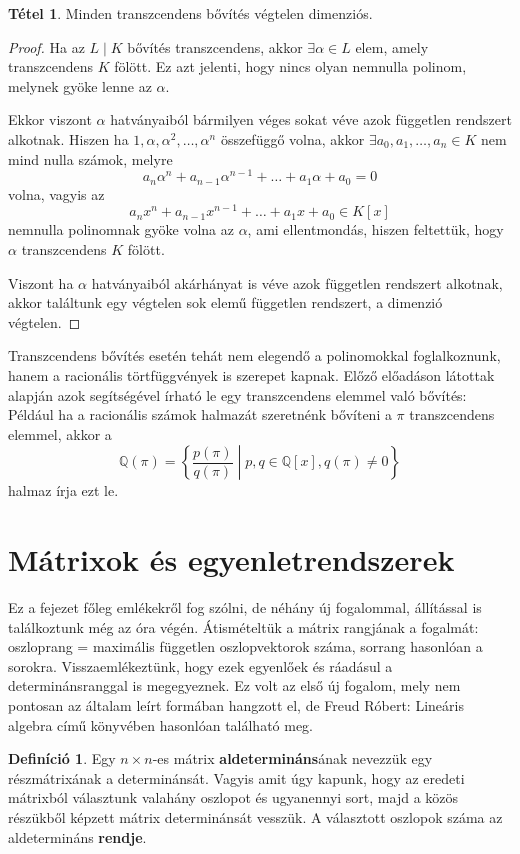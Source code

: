 \documentclass[12pt]{book}
\theoremstyle{plain} %
\theoremstyle{definition} %
\newtheorem{defi/}{Definíció}[section]
\newenvironment{defi}
  {\renewcommand{\qedsymbol}{$\clubsuit$}%
   \pushQED{\qed}\begin{defi/}}
  {\popQED\end{defi/}}
\newtheorem{theo/}{Tétel}[section]
\newenvironment{theo}
  {\renewcommand{\qedsymbol}{$\clubsuit$}%
   \pushQED{\qed}\begin{theo/}}
  {\popQED\end{theo/}}
\theoremstyle{remark}
\renewcommand\qedsymbol{$\blacksquare$}
\numberwithin{equation}{section}  %
\begin{document}
	\begin{theo}\label{tr_bővítés}
		Minden transzcendens bővítés végtelen dimenziós.
	\end{theo}

	\begin{proof}
		Ha az $L\mid K$ bővítés transzcendens, akkor $\exists \alpha \in L$ elem, amely transzcendens $K$ fölött. Ez azt jelenti, hogy nincs olyan nemnulla polinom, melynek gyöke lenne az $\alpha$.
		
		Ekkor viszont $\alpha$ hatványaiból bármilyen véges sokat véve azok független rendszert alkotnak. Hiszen ha $1,\alpha,\alpha^2,\ldots, \alpha^n$ összefüggő volna, akkor $\exists a_0, a_1, \ldots, a_n\in K$ nem mind nulla számok, melyre
		\[ a_n\alpha^n + a_{n-1}\alpha^{n-1} + \ldots + a_1 \alpha + a_0 = 0 \]
		volna, vagyis az
		\[ a_nx^n + a_{n-1}x^{n-1} + \ldots + a_1 x + a_0 \in K[x] \]
		nemnulla polinomnak gyöke volna az $\alpha$, ami ellentmondás, hiszen feltettük, hogy $\alpha$ transzcendens $K$ fölött.
		
		Viszont ha $\alpha$ hatványaiból akárhányat is véve azok független rendszert alkotnak, akkor találtunk egy végtelen sok elemű független rendszert, a dimenzió végtelen.
	\end{proof}

	Transzcendens bővítés esetén tehát nem elegendő a polinomokkal foglalkoznunk, hanem a racionális törtfüggvények is szerepet kapnak. Előző előadáson látottak alapján azok segítségével írható le egy transzcendens elemmel való bővítés: Például ha a racionális számok halmazát szeretnénk bővíteni a $\pi$ transzcendens elemmel, akkor a
	\[ \mathbb{Q}(\pi) = \left \{ \dfrac{p(\pi)}{q(\pi)} \middle | p,q\in \mathbb{Q}[x], q(\pi)\neq 0 \right \}  \]
	halmaz írja ezt le.

	\section{Mátrixok és egyenletrendszerek}
	Ez a fejezet főleg emlékekről fog szólni, de néhány új fogalommal, állítással is találkoztunk még az óra végén. Átismételtük a mátrix rangjának a fogalmát: oszloprang = maximális független oszlopvektorok száma, sorrang hasonlóan a sorokra. Visszaemlékeztünk, hogy ezek egyenlőek és ráadásul a determinánsranggal is megegyeznek. Ez volt az első új fogalom, mely nem pontosan az általam leírt formában hangzott el, de Freud Róbert: Lineáris algebra című könyvében hasonlóan található meg.
	
	\begin{defi}
		Egy $n\times n$-es mátrix \textbf{aldetermináns}ának nevezzük egy részmátrixának a determinánsát. Vagyis amit úgy kapunk, hogy az eredeti mátrixból választunk valahány oszlopot és ugyanennyi sort, majd a közös részükből képzett mátrix determinánsát vesszük. A választott oszlopok száma az aldetermináns \textbf{rendje}.
	\end{defi}
	
\end{document}
